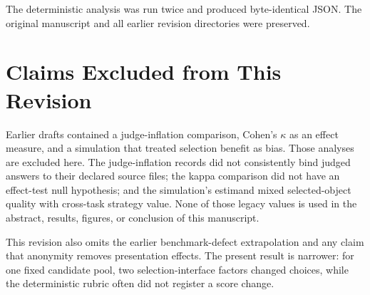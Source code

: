 \documentclass[11pt]{article}
\begin{document}
The deterministic analysis was run twice and produced byte-identical JSON. The original manuscript
and all earlier revision directories were preserved.

\section{Claims Excluded from This Revision}\label{app:excluded}

Earlier drafts contained a judge-inflation comparison, Cohen's \(\kappa\) as an effect measure, and a
simulation that treated selection benefit as bias. Those analyses are excluded here. The
judge-inflation records did not consistently bind judged answers to their declared source files; the
kappa comparison did not have an effect-test null hypothesis; and the simulation's estimand mixed
selected-object quality with cross-task strategy value. None of those legacy values is used in the
abstract, results, figures, or conclusion of this manuscript.

This revision also omits the earlier benchmark-defect extrapolation and any claim that anonymity
removes presentation effects. The present result is narrower: for one fixed candidate pool, two
selection-interface factors changed choices, while the deterministic rubric often did not register a
score change.



\end{document}
